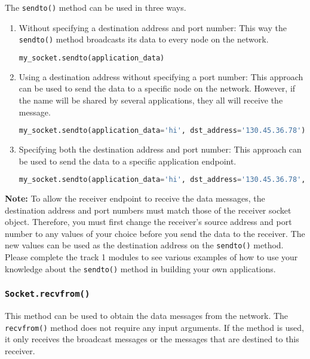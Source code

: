\documentclass[11pt]{article}
\begin{document}
The \texttt{sendto()} method can be used in three ways.
\begin{enumerate}
    \item Without specifying a destination address and port number: This way the \texttt{sendto()} method broadcasts its data to every node on the network.
        \begin{lstlisting}[caption={}, language=Python]
my_socket.sendto(application_data)
        \end{lstlisting}

    \item Using a destination address without specifying a port number: This approach can be used to send the data to a specific node on the network. However, if the name will be shared by several applications, they all will receive the message.
        \begin{lstlisting}[caption={}, language=Python]
my_socket.sendto(application_data='hi', dst_address='130.45.36.78')
        \end{lstlisting}

    \item Specifying both the destination address and port number: This approach can be used to send the data to a specific application endpoint.
        \begin{lstlisting}[caption={}, language=Python]
my_socket.sendto(application_data='hi', dst_address='130.45.36.78', dst_port='app1')
        \end{lstlisting}
\end{enumerate}

\textbf{Note:}
To allow the receiver endpoint to receive the data messages, the destination address and port numbers must match those of the receiver socket object.
Therefore, you must first change the receiver's source address and port number to any values of your choice before you send the data to the receiver.
The new values can be used as the destination address on the \texttt{sendto()} method.
Please complete the track 1 modules to see various examples of how to use your knowledge about the \texttt{sendto()} method in building your own applications.

\subsubsection{\texttt{Socket.recvfrom()}}
This method can be used to obtain the data messages from the network. The \texttt{recvfrom()} method does not require any input arguments. If the method is used, it only receives the broadcast messages or the messages that are destined to this receiver.
\end{document}
